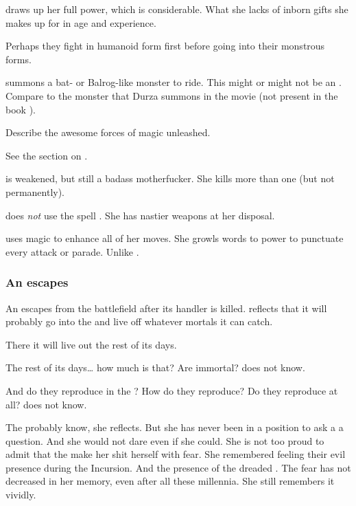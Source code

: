 \Achsah{} draws up her full power, which is considerable. 
What she lacks of inborn gifts she makes up for in age and experience. 


Perhaps they fight in humanoid form first before going into their monstrous forms. 

\Achsah{} summons a bat- or Balrog-like monster to ride. 
This might or might not be an . 
Compare to the monster that Durza summons in the movie \cite{Movie:Eragon} (not present in the book \cite{ChristopherPaolini:Eragon}). 

Describe the awesome forces of magic unleashed.

See the section on .

\Nzessuacrith{} is weakened, but still a badass motherfucker. 
She kills more than one \resphan{} (but not permanently). 

\Nzessuacrith{} does \emph{not} use the spell . 
She has nastier weapons at her disposal. 

\Nzessuacrith{} uses magic to enhance all of her moves. 
She growls words to power to punctuate every attack or parade. 
Unlike \Ishnaruchaefir. 





\subsubsection{An \umbra escapes}
An \umbra{} escapes from the battlefield after its handler is killed. 
\Achsah{} reflects that it will probably go into the \Wylde{} and live off whatever mortals it can catch. 

There it will live out the rest of its days. 

The rest of its days\ldots{} how much is that? 
Are \umbrae{} immortal? 
\Achsah{} does not know. 

And do they reproduce in the \Wylde{}?
How do they reproduce? 
Do they reproduce at all? 
\Achsah{} does not know. 

The \banelords{} probably know, she reflects. 
But she has never been in a position to ask a \banelord{} a question. 
And she would not dare even if she could. 
She is not too proud to admit that the \banelords{} make her shit herself with fear. 
She remembered feeling their evil presence during the Incursion. 
And the presence of the dreaded \Voidbringer. 
The fear has not decreased in her memory, even after all these millennia. 
She still remembers it vividly. 

